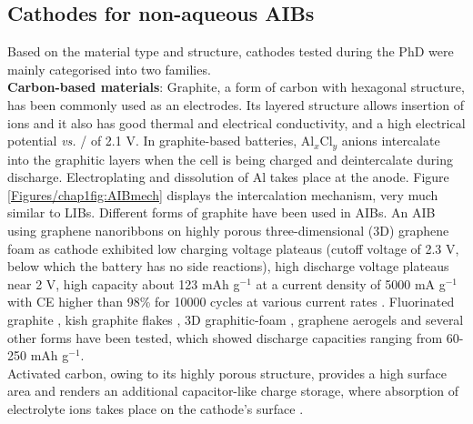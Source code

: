 \subsection{Cathodes for non-aqueous AIBs}
Based on the material type and structure, cathodes tested during the PhD were mainly categorised into two families.\\
\textbf{Carbon-based materials}: Graphite, a form of carbon with hexagonal structure, has been commonly used as an electrodes. Its layered structure allows insertion of ions and it also has good thermal and electrical conductivity, and a high electrical potential \textit{vs.} / of 2.1 V. In graphite-based batteries, Al$_x$Cl$_y$ anions intercalate into the graphitic layers when the cell is being charged and deintercalate during discharge. Electroplating and dissolution of Al takes place at the anode. Figure \ref{Figures/chap1fig:AIBmech} displays the intercalation mechanism, very much similar to LIBs. Different forms of graphite have been used in AIBs. An AIB using graphene nanoribbons on highly porous three-dimensional (3D) graphene foam as cathode exhibited low charging voltage plateaus (cutoff voltage of 2.3 V, below which the battery has no side reactions), high discharge voltage plateaus near 2 V, high capacity about 123 mAh g$^{-1}$ at a current density of 5000 mA g$^{-1}$ with CE higher than 98\% for 10000 cycles at various current rates \cite{yu_graphene_2017}. Fluorinated graphite \cite{rani_fluorinated_2013}, kish graphite flakes \cite{wang_kish_2017}, 3D graphitic-foam \cite{wu_3d_2016}, graphene aerogels\cite{huang_graphene_2019} and several other forms have been tested, which showed discharge capacities ranging from 60-250 mAh g$^{-1}$. \\
Activated carbon, owing to its highly porous structure, provides a high surface area and renders an additional capacitor-like charge storage, where absorption of electrolyte ions takes place on the cathode's surface \cite{eliad_ion_2001, zhu_carbon-based_2011}.\\

